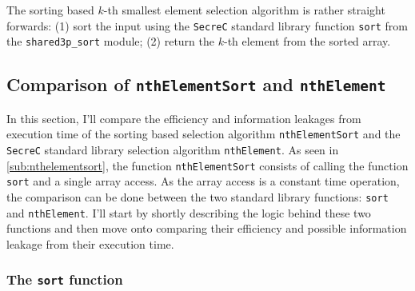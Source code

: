 \documentclass[11pt]{article}
\newcommand{\ct}[1]{\texttt{#1}}
\newcommand{\SC}{\ct{SecreC}\xspace}
\begin{document}
The sorting based $k$-th smallest element selection algorithm is rather straight forwards: (1) sort the input using the \SC standard library function \ct{sort} from the \ct{shared3p\_sort} module; (2) return the $k$-th element from the sorted array. 




\subsection{Comparison of \ct{nthElementSort} and \ct{nthElement}} %
\label{sub:comparison_of_nthelementsort_and_nthelement}

In this section, I'll compare the efficiency and information leakages from execution time of the sorting based selection algorithm \ct{nthElementSort} and the \SC standard library selection algorithm \ct{nthElement}. As seen in \cref{sub:nthelementsort}, the function \ct{nthElementSort} consists of calling the function \ct{sort} and a single array access. As the array access is a constant time operation, the comparison can be done between the two standard library functions: \ct{sort} and \ct{nthElement}. I'll start by shortly describing the logic behind these two functions and then move onto comparing their efficiency and possible information leakage from their execution time.

\subsubsection{The \ct{sort} function} %
\label{ssub:the_sort_function}
 
\end{document}
